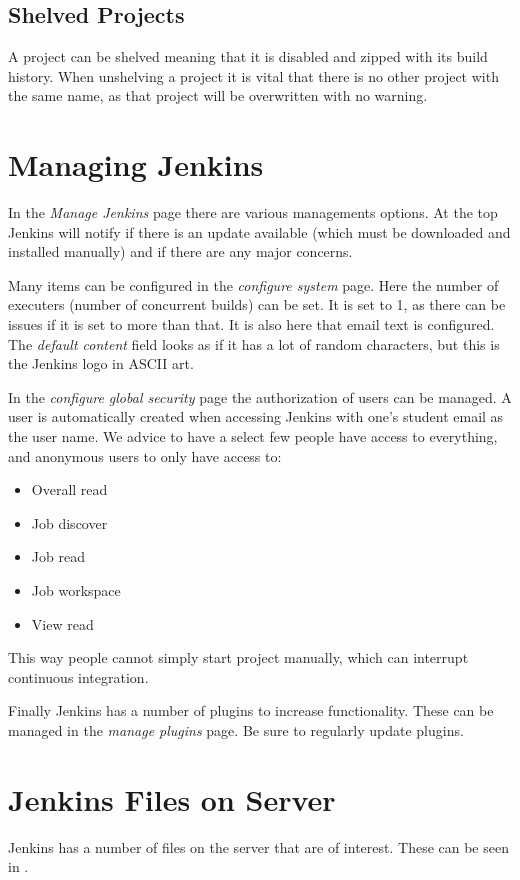 \subsection{Shelved Projects}
A project can be shelved meaning that it is disabled and zipped with its build history. When unshelving a project it is vital that there is no other project with the same name, as that project will be overwritten with no warning.

\section{Managing Jenkins}
In the \emph{Manage Jenkins} page there are various managements options. At the top Jenkins will notify if there is an update available (which must be downloaded and installed manually) and if there are any major concerns.

Many items can be configured in the \emph{configure system} page. Here the number of executers (number of concurrent builds) can be set. It is set to 1, as there can be issues if it is set to more than that. It is also here that email text is configured. The \emph{default content} field looks as if it has a lot of random characters, but this is the Jenkins logo in ASCII art.

In the \emph{configure global security} page the authorization of users can be managed. A user is automatically created when accessing Jenkins with one's student email as the user name. We advice to have a select few people have access to everything, and anonymous users to only have access to:

\begin{itemize}
  \item Overall read
  \item Job discover
  \item Job read
  \item Job workspace
  \item View read
\end{itemize}

This way people cannot simply start project manually, which can interrupt continuous integration.

Finally Jenkins has a number of plugins to increase functionality. These can be managed in the \emph{manage plugins} page. Be sure to regularly update plugins.

\section{Jenkins Files on Server}
Jenkins has a number of files on the server that are of interest. These can be seen in .

